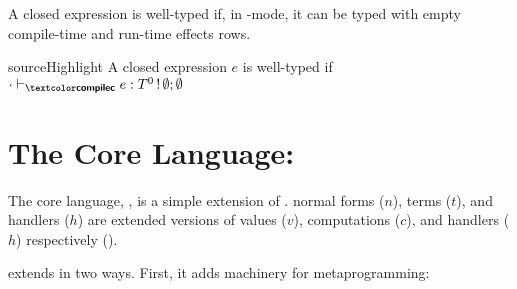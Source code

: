 A closed \sourceLang{} expression is well-typed if, in \compilemode{}-mode, it can be typed with empty compile-time and run-time effects rows. 
\begin{definition}{sourceHighlight}
  A closed expression $e$ is well-typed if $\ctypejudge[\cdot]{e}{T^0 \, ! \, \emptyset;\emptyset}$
\end{definition}

\section{The Core Language: \texorpdfstring{\coreLang{}}{Lambda-Op-AST}}\label{section:core-lang}
The core language, \coreLang{}, is a simple extension of \efflang{}. \coreLang{} normal forms ($n$), terms ($t$), and handlers ($h$) are extended versions of \efflang{} values ($v$), computations ($c$), and handlers ($h$) respectively ().  

\coreLang{} extends \efflang{} in two ways. First, it adds machinery for metaprogramming:

